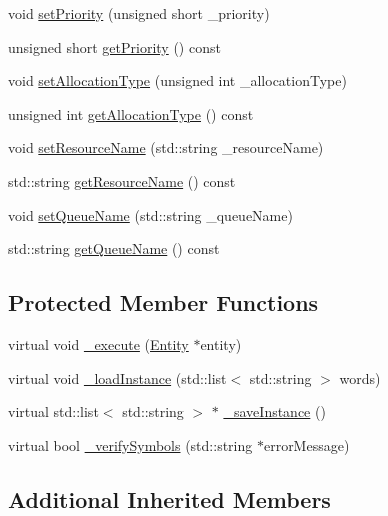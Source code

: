 \begin{DoxyCompactItemize}
\item 
void \hyperlink{class_seize_aa9c7a856ef519696526192a06dab9551}{set\+Priority} (unsigned short \+\_\+priority)
\item 
unsigned short \hyperlink{class_seize_aae382dc1d1d3dc9a3de927cc9d7811c9}{get\+Priority} () const 
\item 
void \hyperlink{class_seize_a4f6354bf4897ce4c46ff9c1e2dd5c150}{set\+Allocation\+Type} (unsigned int \+\_\+allocation\+Type)
\item 
unsigned int \hyperlink{class_seize_ac40f22e56d4448c5d5bae40b64ef4deb}{get\+Allocation\+Type} () const 
\item 
void \hyperlink{class_seize_a2bdaa616c4fd499f754099eb59729547}{set\+Resource\+Name} (std\+::string \+\_\+resource\+Name)
\item 
std\+::string \hyperlink{class_seize_a30781601e8fcfb165c99aee731c081e8}{get\+Resource\+Name} () const 
\item 
void \hyperlink{class_seize_a4d24a3326db05e92439379e1c4efa940}{set\+Queue\+Name} (std\+::string \+\_\+queue\+Name)
\item 
std\+::string \hyperlink{class_seize_a37f2b1a10e1ae390d5186a87bdebe30a}{get\+Queue\+Name} () const 
\end{DoxyCompactItemize}
\subsection*{Protected Member Functions}
\begin{DoxyCompactItemize}
\item 
virtual void \hyperlink{class_seize_a96f6517a40b3bfd0d5ea753d59cef797}{\+\_\+execute} (\hyperlink{class_entity}{Entity} $\ast$entity)
\item 
virtual void \hyperlink{class_seize_a421a0ec6382cb30f6a0342f8dea050db}{\+\_\+load\+Instance} (std\+::list$<$ std\+::string $>$ words)
\item 
virtual std\+::list$<$ std\+::string $>$ $\ast$ \hyperlink{class_seize_a38a8af6942b51ce11d191469d277661d}{\+\_\+save\+Instance} ()
\item 
virtual bool \hyperlink{class_seize_a51dc9257dc692083006f676546ddfff8}{\+\_\+verify\+Symbols} (std\+::string $\ast$error\+Message)
\end{DoxyCompactItemize}
\subsection*{Additional Inherited Members}


